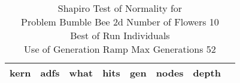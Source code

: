 \begin{table}[H]
\caption{Shapiro Test of Normality for \\ Problem  Bumble Bee 2d  Number of Flowers 10\\Best of Run Individuals \\ Use of Generation Ramp  Max Generations 52\\}
\begin{center}
\scalebox{0.8} %
{
\begin{tabular}{lrrrrrrr}
\hline
kern & adfs & what & hits & gen & nodes & depth \\
\hline


\end{tabular}
}
\end{center}
\end{table}

